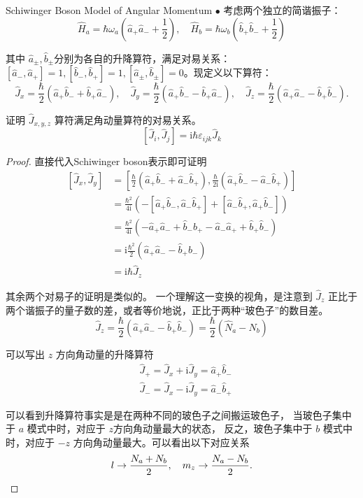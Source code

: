 \begin{5}
    Schiwinger Boson Model of Angular Momentum $\bullet$ 考虑两个独立的简谐振子：
$$\hat{H}_{a}=\hbar \omega_{a}\left(\hat{a}_{+} \hat{a}_{-}+\frac{1}{2}\right), 
\quad \hat{H}_{b}=\hbar \omega_{b}\left(\hat{b}_{+} \hat{b}_{-}+\frac{1}{2}\right)$$

其中 $\hat{a}_{ \pm}, \hat{b}{ }_{ \pm}$分别为各自的升降算符，满足对易关系：$[\hat{a}_{-}, \hat{a}_{+}]=1, [\hat{b}_{-}, \hat{b}_{+}]=1,[\hat{a}_{\pm}, \hat{b}_{\pm}]=0$。现定义以下算符：
$$\hat{J}_{x}=\frac{\hbar}{2}\left(\hat{a}_{+} \hat{b}_{-}+\hat{b}_{+} \hat{a}_{-}\right), 
\quad \hat{J}_{y}=\frac{\hbar}{2}\left(\hat{a}_{+} \hat{b}_{-}-\hat{b}_{+} \hat{a}_{-}\right), 
\quad \hat{J}_{z}=\frac{\hbar}{2}\left(\hat{a}_{+} \hat{a}_{-}-\hat{b}_{+} \hat{b}_{-}\right).$$

证明 $\hat{J}_{x, y, z}$ 算符满足角动量算符的对易关系。
$$\left[\hat{J}_{i}, \hat{J}_{j}\right]
=\mathrm{i} \hbar \varepsilon_{i j k} \hat{J}_{k}$$
\end{5}
\begin{proof}
直接代入Schiwinger boson表示即可证明
$$
\begin{aligned}
{\left[\hat{J}_{x}, \hat{J}_{y}\right] } & =\left[\frac{\hbar}{2}\left(\hat{a}_{+} \hat{b}_{-}+\hat{a}_{-} \hat{b}_{+}\right), \frac{\hbar}{2 \mathrm{i}}\left(\hat{a}_{+} \hat{b}_{-}-\hat{a}_{-} \hat{b}_{+}\right)\right] \\
& =\frac{\hbar^{2}}{4 \mathrm{i}}\left(-\left[\hat{a}_{+} \hat{b}_{-}, \hat{a}_{-} \hat{b}_{+}\right]+\left[\hat{a}_{-} \hat{b}_{+}, \hat{a}_{+} \hat{b}_{-}\right]\right) \\
& =\frac{\hbar^{2}}{4 \mathrm{i}}\left(-\hat{a}_{+} \hat{a}_{-}+\hat{b}_{-} \hat{b}_{+}-\hat{a}_{-} \hat{a}_{+}+\hat{b}_{+} \hat{b}_{-}\right) \\
& =\mathrm{i} \frac{\hbar^{2}}{2}\left(\hat{a}_{+} \hat{a}_{-}-\hat{b}_{+} \hat{b}_{-}\right) \\
& =\mathrm{i} \hbar \hat{J}_{z}
\end{aligned}
$$

其余两个对易子的证明是类似的。
一个理解这一变换的视角，是注意到 $\hat{J}_{z}$ 正比于两个谐振子的量子数的差，或者等价地说，正比于两种``玻色子''的数目差。
$$\hat{J}_{z}=\frac{\hbar}{2}\left(\hat{a}_{+} \hat{a}_{-}-\hat{b}_{+} \hat{b}_{-}\right)
=\frac{\hbar}{2}\left(\hat{N}_{a}-\hat{N}_{b}\right)$$

可以写出 $z$ 方向角动量的升降算符
$$
\begin{aligned}
& \hat{J}_{+}=\hat{J}_{x}+\mathrm{i} \hat{J}_{y}=\hat{a}_{+} \hat{b}_{-} \\
& \hat{J}_{-}=\hat{J}_{x}-\mathrm{i} \hat{J}_{y}=\hat{a}_{-} \hat{b}_{+}
\end{aligned}
$$

可以看到升降算符事实是是在两种不同的玻色子之间搬运玻色子，
当玻色子集中于 $a$ 模式中时，对应于 $z$方向角动量最大的状态，
反之，玻色子集中于 $b$ 模式中时，对应于 $-z$ 方向角动量最大。可以看出以下对应关系
$$l \rightarrow \frac{N_{a}+N_{b}}{2}, 
\quad m_{z} \rightarrow \frac{N_{a}-N_{b}}{2}.\qedhere$$
\end{proof}